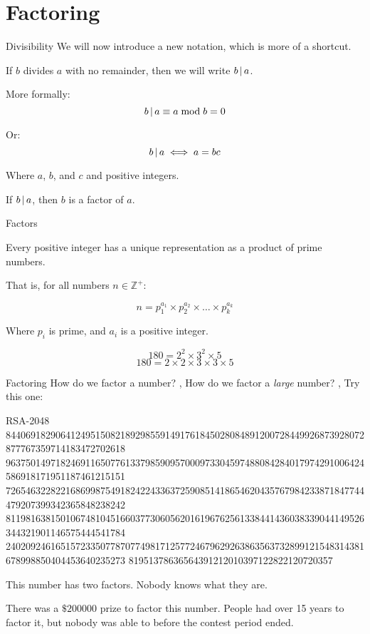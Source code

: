 \section{Factoring}
\begin{namedframe}{Divisibility}
	We will now introduce a new notation, which is more of a shortcut.

	If $b$ divides $a$ with no remainder, then we will write $b \operatorname{|} a$.

	More formally:
	\[b \operatorname{|} a \equiv a \bmod b = 0\]

	Or:
	\[b \operatorname{|} a \iff a = bc\]

	Where $a$, $b$, and $c$ and positive integers.

	If $b \operatorname{|} a$, then $b$ is a factor of $a$.
\end{namedframe}
\begin{namedframe}{Factors}
	\begin{theorem}
		Every positive integer has a unique representation as a product of prime numbers.

		That is, for all numbers $n \in \mathbb{Z}^+$:
		
		\[n = p_1^{a_1} \times p_2^{a_2} \times \dots \times p_k^{a_k}\]

		Where $p_i$ is prime, and $a_i$ is a positive integer.
	\end{theorem}
	\pause
	\begin{example}[180]
		\[180 = 2^2 \times 3^2 \times 5\]
		\[180 = 2 \times 2 \times 3 \times 3 \times 5\]
	\end{example}
\end{namedframe}
\begin{namedframe}{Factoring}
	How do we factor a number?
	\sep
	How do we factor a \emph{large} number?
	\sep
	Try this one:
	\begin{block}{RSA-2048}
		\tiny
		844069182906412495150821892985591491761845028084891200728449926873928072877767359714183472702618
		963750149718246911650776133798590957000973304597488084284017974291006424586918171951187461215151
		726546322822168699875491824224336372590851418654620435767984233871847744479207399342365848238242
		811981638150106748104516603773060562016196762561338441436038339044149526344321901146575444541784
		240209246165157233507787077498171257724679629263863563732899121548314381678998850404453640235273
		81951378636564391212010397122822120720357
	\end{block}
	\pause
	This number has two factors. Nobody knows what they are.

	There was a $\$\num{200000}$ prize to factor this number.
	People had over 15 years to factor it, but nobody was able to before the contest period ended.
\end{namedframe}
